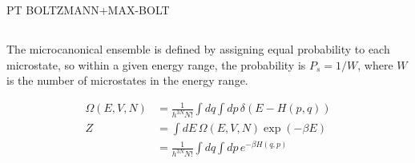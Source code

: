 \documentclass[a4paper, english, 12pt]{article}
\begin{document}
\begin{multicols*}{2}
PT 
BOLTZMANN+MAX-BOLT 

\subsection*{}

The microcanonical ensemble is defined by assigning equal probability to each microstate, so within a given energy range, the probability is $P_s=1/W$, where $W$ is the number of microstates in the energy range.   

\begin{align*}
    \Omega(E,V,N) &=\frac{1}{h^{3N}N!}\int dq \int dp\, \delta(E-H(p,q)) \\
    Z &= \int dE\, \Omega(E,V,N) \exp(-\beta E) \\
    &= \frac{1}{h^{3N}N!}\int dq \int dp\, e^{-\beta H(q,p)} 
\end{align*}



\end{multicols*}
\end{document}
